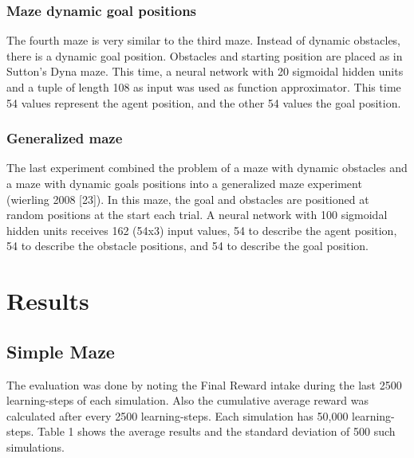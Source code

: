 \hypertarget{maze-dynamic-goal-positions}{%
\subsubsection{Maze dynamic goal
positions}\label{maze-dynamic-goal-positions}}

The fourth maze is very similar to the third maze. Instead of dynamic
obstacles, there is a dynamic goal position. Obstacles and starting
position are placed as in Sutton's Dyna maze. This time, a neural
network with 20 sigmoidal hidden units and a tuple of length 108 as
input was used as function approximator. This time 54 values represent
the agent position, and the other 54 values the goal position.

\hypertarget{generalized-maze}{%
\subsubsection{Generalized maze}\label{generalized-maze}}

The last experiment combined the problem of a maze with dynamic
obstacles and a maze with dynamic goals positions into a generalized
maze experiment (wierling 2008 {[}23{]}). In this maze, the goal and
obstacles are positioned at random positions at the start each trial. A
neural network with 100 sigmoidal hidden units receives 162 (54x3) input
values, 54 to describe the agent position, 54 to describe the obstacle
positions, and 54 to describe the goal position.


\hypertarget{results}{%
\section{Results}\label{results}}

\hypertarget{simple-maze}{%
\subsection{Simple Maze}\label{simple-maze}}

The evaluation was done by noting the Final Reward intake during the
last 2500 learning-steps of each simulation. Also the cumulative average
reward was calculated after every 2500 learning-steps. Each simulation
has 50,000 learning-steps. Table 1 shows the average results and the
standard deviation of 500 such simulations.

